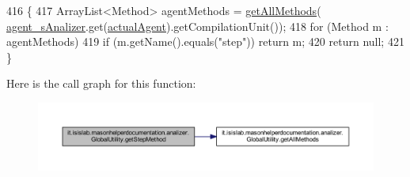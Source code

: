 \begin{DoxyCode}
416                                         \{
417         ArrayList<Method> agentMethods = \hyperlink{classit_1_1isislab_1_1masonhelperdocumentation_1_1analizer_1_1_global_utility_aaa103a9dda7ed0230fd1f8d65d4cc5d4}{getAllMethods}(
      \hyperlink{classit_1_1isislab_1_1masonhelperdocumentation_1_1analizer_1_1_global_utility_a82af8b91f98c70ad25d504cc16e424b9}{agent\_sAnalizer}.get(\hyperlink{classit_1_1isislab_1_1masonhelperdocumentation_1_1analizer_1_1_global_utility_a8106b6699b9c7834ead4fc38d62a2575}{actualAgent}).getCompilationUnit());
418         \textcolor{keywordflow}{for} (Method m : agentMethods)
419             \textcolor{keywordflow}{if} (m.getName().equals(\textcolor{stringliteral}{"step"})) \textcolor{keywordflow}{return} m;
420         \textcolor{keywordflow}{return} null;
421     \}
\end{DoxyCode}


Here is the call graph for this function\-:\nopagebreak
\begin{figure}[H]
\begin{center}
\leavevmode
\includegraphics[width=350pt]{classit_1_1isislab_1_1masonhelperdocumentation_1_1analizer_1_1_global_utility_ab8caf9838cc1fb62385c3a680b1a4e0f_cgraph}
\end{center}
\end{figure}


